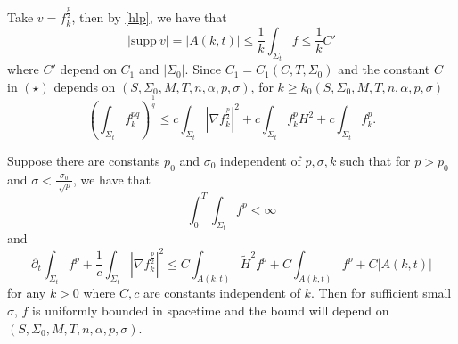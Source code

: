 Take $v=f_{k}^{\frac{p}{2}} $, then by \autoref{hlp}, we have that 
\[\left| \mathrm{supp}  \  v \right|=\left| A(k,t) \right| \leq \frac{1}{k} \int_{\Sigma_t} f \leq \frac{1}{k} C'  \]
where $C'$ depend on $C_1$ and $\left| \Sigma_0 \right| $. Since $C_1=C_1(C,T,\Sigma _0)$ and the constant $C$ in $(\star )$ depends on $(S,\Sigma _0,M,T,n,\alpha ,p,\sigma )$, for $k \geq k_0(S,\Sigma _0,M,T,n,\alpha ,p,\sigma ) $
\begin{equation} \label{MSF}
    \left(\int_{\Sigma_t} f_{k}^{pq} \right) ^{\frac{1}{q}} \leq c \int_{\Sigma_t} \left| \nabla f_{k}^{\frac{p}{2}} \right| ^2 + c \int_{\Sigma_t} f_{k}^{p} H^2 + c \int_{\Sigma_t} f_{k}^{p}.
\end{equation}

\begin{theorem}
    Suppose there are constants $p_0$ and $\sigma _0$ independent of $p, \sigma , k$ such that for $p>p_0$ and $\sigma < \frac{\sigma _0}{\sqrt[]{p}}$, we have that 
    \[\int_{0}^{T}\int_{\Sigma_t} f^p < \infty \]
    and
    \begin{equation} \label{ELEFP}
        \partial _t \int_{\Sigma_t} f^p + \frac{1}{c} \int_{\Sigma_t} \left| \nabla f_{k}^{\frac{p}{2}}  \right| ^2 \leq C \int_{A(k,t)}^{} \tilde{H}^2 f^p +C \int_{A(k,t)}^{}f^p + C \left| A(k,t) \right| 
    \end{equation}
    for any $k>0$ where $C,c$ are constants independent of $k$.
    Then for sufficient small $\sigma $, $f$ is uniformly bounded in spacetime and the bound will depend on $(S,\Sigma _0,M,T,n,\alpha ,p,\sigma )$.
\end{theorem}

